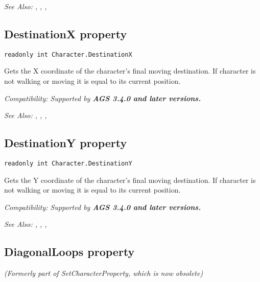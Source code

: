 \it{See Also:} ,
,
,


\subsection{DestinationX property}\label{Character.DestinationX}%

\begin{verbatim}
readonly int Character.DestinationX
\end{verbatim}
Gets the X coordinate of the character's final moving destination. If character is not walking
or moving it is equal to its current position.

\it{Compatibility:} Supported by \bf{AGS 3.4.0} and later versions.

\it{See Also:} ,
,
,


\subsection{DestinationY property}\label{Character.DestinationY}%

\begin{verbatim}
readonly int Character.DestinationY
\end{verbatim}
Gets the Y coordinate of the character's final moving destination. If character is not walking
or moving it is equal to its current position.

\it{Compatibility:} Supported by \bf{AGS 3.4.0} and later versions.

\it{See Also:} ,
,
,


\subsection{DiagonalLoops property}\label{Character.DiagonalLoops}%

\it{(Formerly part of SetCharacterProperty, which is now obsolete)}

